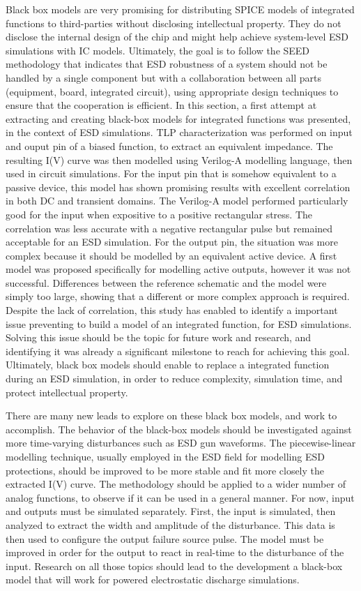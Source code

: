 Black box models are very promising for distributing SPICE models of integrated functions to third-parties without disclosing intellectual property.
They do not disclose the internal design of the chip and might help achieve system-level ESD simulations with IC models.
Ultimately, the goal is to follow the SEED \cite{seed} methodology that indicates that ESD robustness of a system should not be handled by a single component but with a collaboration between all parts (equipment, board, integrated circuit), using appropriate design techniques to ensure that the cooperation is efficient.
In this section, a first attempt at extracting and creating black-box models for integrated functions was presented, in the context of ESD simulations.
TLP characterization was performed on input and ouput pin of a biased function, to extract an equivalent impedance.
The resulting I(V) curve was then modelled using Verilog-A modelling language, then used in circuit simulations.
For the input pin that is somehow equivalent to a passive device, this model has shown promising results with excellent correlation in both DC and transient domains.
The Verilog-A model performed particularly good for the input when expositive to a positive rectangular stress.
The correlation was less accurate with a negative rectangular pulse but remained acceptable for an ESD simulation.
For the output pin, the situation was more complex because it should be modelled by an equivalent active device.
A first model was proposed specifically for modelling active outputs, however it was not successful.
Differences between the reference schematic and the model were simply too large, showing that a different or more complex approach is required.
Despite the lack of correlation, this study has enabled to identify a important issue preventing to build a model of an integrated function, for ESD simulations.
Solving this issue should be the topic for future work and research, and identifying it was already a significant milestone to reach for achieving this goal.
Ultimately, black box models should enable to replace a integrated function during an ESD simulation, in order to reduce complexity, simulation time, and protect intellectual property.

There are many new leads to explore on these black box models, and work to accomplish.
The behavior of the black-box models should be investigated against more time-varying disturbances such as ESD gun waveforms.
The piecewise-linear modelling technique, usually employed in the ESD field for modelling ESD protections, should be improved to be more stable and fit more closely the extracted I(V) curve.
The methodology should be applied to a wider number of analog functions, to observe if it can be used in a general manner.
For now, input and outputs must be simulated separately.
First, the input is simulated, then analyzed to extract the width and amplitude of the disturbance.
This data is then used to configure the output failure source pulse.
The model must be improved in order for the output to react in real-time to the disturbance of the input.
Research on all those topics should lead to the development a black-box model that will work for powered electrostatic discharge simulations.

